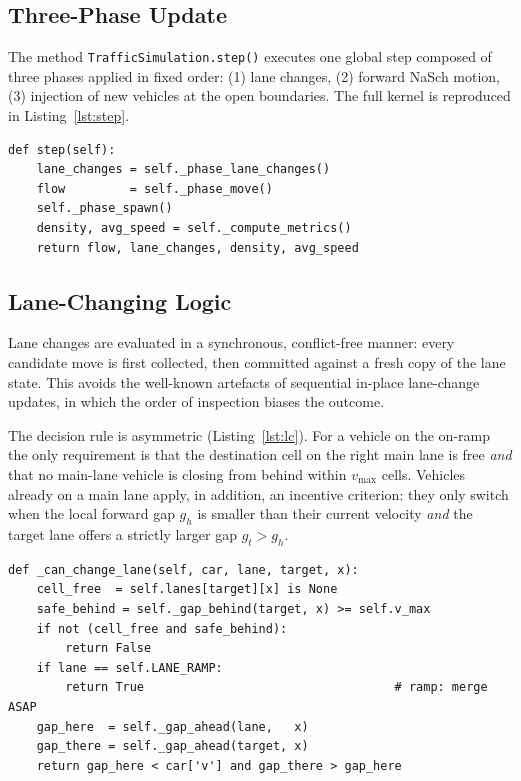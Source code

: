 \documentclass[11pt,a4paper]{article}
\begin{document}
\subsection{Three-Phase Update}

The method \texttt{TrafficSimulation.step()} executes one global step
composed of three phases applied in fixed order: (1) lane changes, (2)
forward NaSch motion, (3) injection of new vehicles at the open boundaries.
The full kernel is reproduced in
Listing~\ref{lst:step}.

\begin{lstlisting}[caption={Top-level update from \texttt{simulation.py}.},label={lst:step}]
def step(self):
    lane_changes = self._phase_lane_changes()
    flow         = self._phase_move()
    self._phase_spawn()
    density, avg_speed = self._compute_metrics()
    return flow, lane_changes, density, avg_speed
\end{lstlisting}

\subsection{Lane-Changing Logic}

Lane changes are evaluated in a synchronous, conflict-free manner: every
candidate move is first collected, then committed against a fresh copy of
the lane state. This avoids the well-known artefacts of sequential
in-place lane-change updates, in which the order of inspection biases the
outcome.

The decision rule is asymmetric (Listing~\ref{lst:lc}). For a vehicle on
the on-ramp the only requirement is that the destination cell on the right
main lane is free \emph{and} that no main-lane vehicle is closing from
behind within $v_{\max}$ cells. Vehicles already on a main lane apply,
in addition, an incentive criterion: they only switch when the local
forward gap $g_h$ is smaller than their current velocity \emph{and} the
target lane offers a strictly larger gap $g_t > g_h$.

\begin{lstlisting}[caption={Asymmetric lane-change rule.},label={lst:lc}]
def _can_change_lane(self, car, lane, target, x):
    cell_free  = self.lanes[target][x] is None
    safe_behind = self._gap_behind(target, x) >= self.v_max
    if not (cell_free and safe_behind):
        return False
    if lane == self.LANE_RAMP:
        return True                                   # ramp: merge ASAP
    gap_here  = self._gap_ahead(lane,   x)
    gap_there = self._gap_ahead(target, x)
    return gap_here < car['v'] and gap_there > gap_here
\end{lstlisting}
\end{document}
